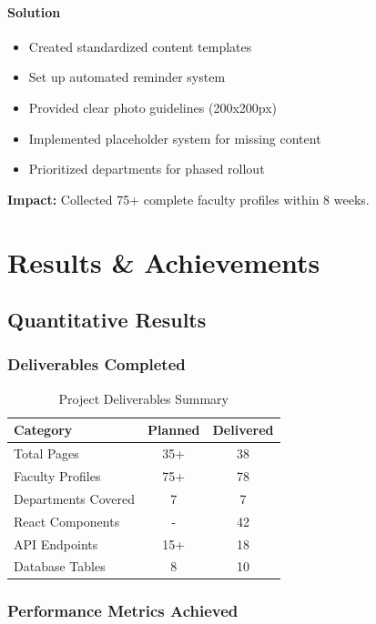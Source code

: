 \documentclass[12pt,a4paper]{report}
\begin{document}
\subsubsection*{Solution}
\begin{itemize}
    \item Created standardized content templates
    \item Set up automated reminder system
    \item Provided clear photo guidelines (200x200px)
    \item Implemented placeholder system for missing content
    \item Prioritized departments for phased rollout
\end{itemize}

\textbf{Impact:} Collected 75+ complete faculty profiles within 8 weeks.

\chapter{Results \& Achievements}

\section{Quantitative Results}

\subsection{Deliverables Completed}

\begin{table}[H]
\centering
\begin{tabular}{|l|c|c|}
\hline
\textbf{Category} & \textbf{Planned} & \textbf{Delivered} \\ \hline
Total Pages & 35+ & 38 \\ \hline
Faculty Profiles & 75+ & 78 \\ \hline
Departments Covered & 7 & 7 \\ \hline
React Components & - & 42 \\ \hline
API Endpoints & 15+ & 18 \\ \hline
Database Tables & 8 & 10 \\ \hline
\end{tabular}
\caption{Project Deliverables Summary}
\end{table}

\subsection{Performance Metrics Achieved}
\end{document}
